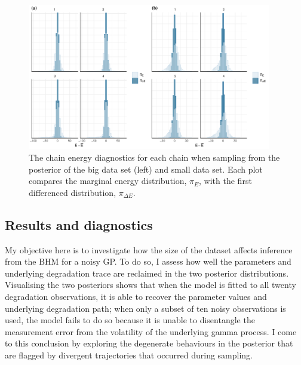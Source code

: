 \begin{figure}
  \centering
  \includegraphics[width=0.95\textwidth]{./figures/ch-4/nuts_energy.pdf}
  \caption{The chain energy diagnostics for each chain when sampling from the posterior of the big data set (left) and small data set. Each plot compares the marginal energy distribution, $\pi_E$, with the first differenced distribution, $\pi_{\Delta E}$.}
  \label{fig:nuts-energies}
\end{figure}

\subsection{Results and diagnostics} \label{sec:noisy-GP-results}

My objective here is to investigate how the size of the dataset affects inference from the BHM for a noisy GP. To do so, I assess how well the parameters and underlying degradation trace are reclaimed in the two posterior distributions. Visualising the two posteriors shows that when the model is fitted to all twenty degradation observations, it is able to recover the parameter values and underlying degradation path; when only a subset of ten noisy observations is used, the model fails to do so because it is unable to disentangle the measurement error from the volatility of the underlying gamma process. I come to this conclusion by exploring the degenerate behaviours in the posterior that are flagged by divergent trajectories that occurred during sampling. 

